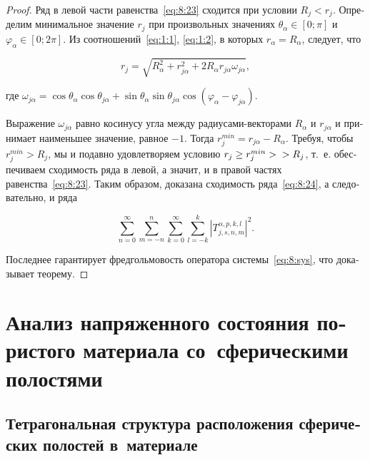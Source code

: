 \begin{russian}
\begin{proof}
Ряд в левой части равенства~\eqref{eq:8:23} сходится при условии $R_j<r_j$. Определим минимальное значение $r_j$ при произвольных значениях $\theta_\alpha\in[0;\pi]$ и $\varphi_\alpha\in[0;2\pi]$. Из соотношений~\eqref{eq:1:1}, \eqref{eq:1:2}, в которых $r_\alpha=R_\alpha$, следует, что

\begin{equation}
r_j = \sqrt{R_\alpha^2 + r_{j\alpha}^2 + 
2R_\alpha r_{j\alpha}\omega_{j\alpha}},
\end{equation}

\noindent где $\omega_{j\alpha}=\cos\theta_\alpha\cos\theta_{j\alpha}+
\sin\theta_\alpha\sin\theta_{j\alpha}\cos(\varphi_\alpha-\varphi_{j\alpha})$.

Выражение $\omega_{j\alpha}$ равно косинусу угла между радиусами-векторами $R_\alpha$ и $r_{j\alpha}$ и принимает наименьшее значение, равное $-1$. Тогда $r_j^{min}=r_{j\alpha}-R_\alpha$. Требуя, чтобы $r_j^{min}>R_j$, мы и подавно удовлетворяем условию $r_j\ge r_j^{min}>\\>R_j$, т.~е. обеспечиваем сходимость ряда в левой, а значит, и в правой частях равенства~\eqref{eq:8:23}. Таким образом, доказана сходимость ряда~\eqref{eq:8:24}, а следовательно, и ряда

\begin{equation}
\sum\limits_{n = 0}^\infty  {\sum\limits_{m =  - n}^n {\sum\limits_{k = 0}^\infty  {\sum\limits_{l =  - k}^k {{{\left| {T_{j,s,n,m}^{\alpha,p,k,l}} \right|}^2}}}}}.
\end{equation}

Последнее гарантирует фредгольмовость оператора системы~\eqref{eq:8:sys}, что доказывает теорему.
\end{proof}

\section[Анализ напряженного состояния пористого материала со сферическими полостями]{Анализ напряженного состояния пористого материала со~сферическими полостями}

\subsection{Тетрагональная структура расположения сферических полостей в~материале}


\end{russian}

